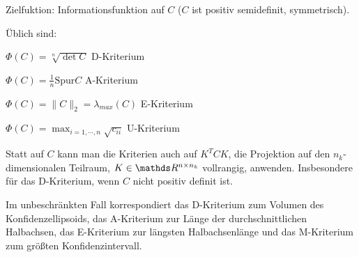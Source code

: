 Zielfuktion: Informationsfunktion auf $C$ ($C$ ist positiv semidefinit, symmetrisch).

Üblich sind:

\bitm
\item $\Phi(C) = \sqrt[n]{\det C}$ D-Kriterium 
\item $\Phi(C) = \frac 1n \mathrm{Spur} C$ A-Kriterium
\item $\Phi(C) = \|C\|_2 = \lambda_{max} (C)$ E-Kriterium
\item $\Phi(C) = \max_{i=1,\cdots,n} \sqrt{c_{ii}}$ U-Kriterium
\eitm


Statt auf $C$ kann man die Kriterien auch auf $K^T C K$, die Projektion auf den $n_k$-dimensionalen Teilraum, $K \in \R^{n\times n_k}$ vollrangig, anwenden. Insbesondere für das D-Kriterium, wenn $C$ nicht positiv definit ist.


Im unbeschränkten Fall korrespondiert das D-Kriterium zum Volumen des Konfidenzellipsoids, das A-Kriterium zur Länge der durchschnittlichen Halbachsen, das E-Kriterium zur längsten Halbachsenlänge und das M-Kriterium zum größten Konfidenzintervall.



















